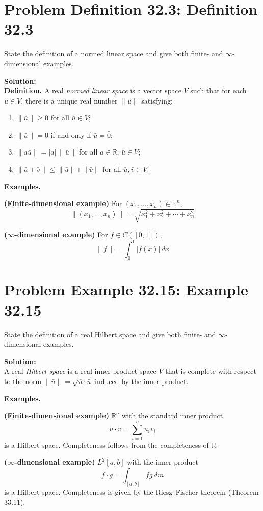 \documentclass[a4paper]{article}
\theoremstyle{definition}
\newcounter{problem}
\newenvironment{problem}[1][]
{
    \stepcounter{problem}
    \section*{Problem \theproblem\ifx\relax#1\relax\else: #1\fi}
}
{}
\newenvironment{solution}
{
    \noindent\textbf{Solution:}\\
}
{
    
}
\begin{document}
\newpage
\begin{problem}[Definition 32.3]
State the definition of a normed linear space and give both finite- and $ \infty $-dimensional examples.
\end{problem}

\vspace{2em}
\begin{solution}
\textbf{Definition.} A real \emph{normed linear space} is a vector space $V$ such that for each $\bar{u} \in V$, there is a unique real number $\|\bar{u}\|$ satisfying:
\begin{enumerate}
    \item $\|\bar{u}\| \ge 0$ for all $\bar{u} \in V$;
    \item $\|\bar{u}\| = 0$ if and only if $\bar{u} = \bar{0}$;
    \item $\|a\bar{u}\| = |a|\,\|\bar{u}\|$ for all $a \in \mathbb{R}$, $\bar{u} \in V$;
    \item $\|\bar{u} + \bar{v}\| \le \|\bar{u}\| + \|\bar{v}\|$ for all $\bar{u}, \bar{v} \in V$.
\end{enumerate}

\medskip

\textbf{Examples.}

\textbf{(Finite-dimensional example)}  
For $(x_1,\dots,x_n) \in \mathbb{R}^n$,
\[
\|(x_1,\dots,x_n)\| = \sqrt{x_1^2 + x_2^2 + \cdots + x_n^2}
\]

\textbf{($\infty$-dimensional example)}  
For $f \in C([0,1])$,
\[
\|f\| = \int_0^1 |f(x)|\,dx
\]
\end{solution}

\newpage
\begin{problem}[Example 32.15]
State the definition of a real Hilbert space and give both finite- and $ \infty $-dimensional examples.
\end{problem}

\vspace{2em}
\begin{solution}
A real \emph{Hilbert space} is a real inner product space $V$ that is complete with respect to the norm $\|\bar{u}\| = \sqrt{\bar{u} \cdot \bar{u}}$ induced by the inner product.

\medskip

\textbf{Examples.}

\textbf{(Finite-dimensional example)}
$\mathbb{R}^n$ with the standard inner product
\[
\bar{u} \cdot \bar{v} = \sum_{i=1}^{n} u_i v_i
\]
is a Hilbert space. Completeness follows from the completeness of $\mathbb{R}$.

\textbf{($\infty$-dimensional example)}
$L^2[a,b]$ with the inner product
\[
f \cdot g = \int_{[a,b]} fg\,dm
\]
is a Hilbert space. Completeness is given by the Riesz--Fischer theorem (Theorem 33.11).
\end{solution}
\end{document}
